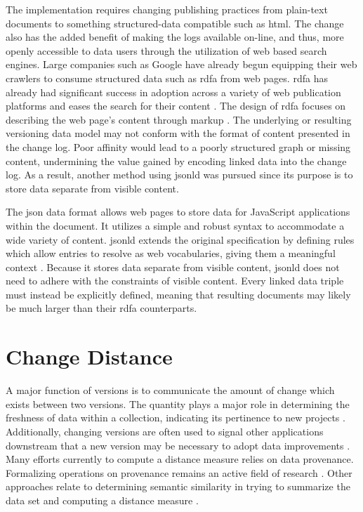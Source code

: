 The implementation requires changing publishing practices from plain-text documents to something structured-data compatible such as \gls{html}.
The change also has the added benefit of making the logs available on-line, and thus, more openly accessible to data users through the utilization of web based search engines.
Large companies such as Google have already begun equipping their web crawlers to consume structured data such as \gls{rdfa} from web pages.
\gls{rdfa} has already had significant success in adoption across a variety of web publication platforms and eases the search for their content \cite{Bizer2013}.
The design of \gls{rdfa} focuses on describing the web page's content through markup \cite{Herman2015}.
The underlying or resulting versioning data model may not conform with the format of content presented in the change log.
Poor affinity would lead to a poorly structured graph or missing content, undermining the value gained by encoding linked data into the change log.
As a result, another method using \gls{jsonld} was pursued since its purpose is to store data separate from visible content.

The \gls{json} data format allows web pages to store data for JavaScript applications within the document.
It utilizes a simple and robust syntax to accommodate a wide variety of content.
\gls{jsonld} extends the original specification by defining rules which allow entries to resolve as web vocabularies, giving them a meaningful context \cite{JSONLD}.
Because it stores data separate from visible content, \gls{jsonld} does not need to adhere with the constraints of visible content.
Every linked data triple must instead be explicitly defined, meaning that resulting documents may likely be much larger than their \gls{rdfa} counterparts.

\section{Change Distance}

A major function of versions is to communicate the amount of change which exists between two versions.
The quantity plays a major role in determining the freshness of data within a collection, indicating its pertinence to new projects \cite{Bouzeghoub:2004:FAD:1012453.1012464}.
Additionally, changing versions are often used to signal other applications downstream that a new version may be necessary to adopt data improvements \cite{TILMES2011548}.
Many efforts currently to compute a distance measure relies on data provenance.
Formalizing operations on provenance remains an active field of research \cite{Ainy:2015:ASD:2806416.2806429}.
Other approaches relate to determining semantic similarity in trying to summarize the data set and computing a distance measure \cite{Hliaoutakis06informationretrieval}.

